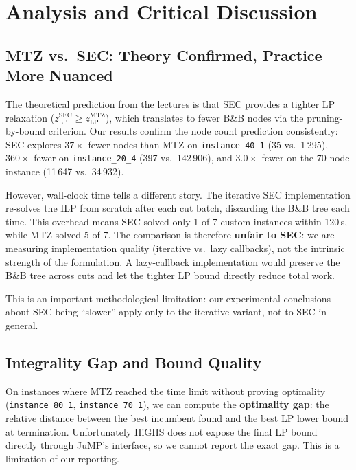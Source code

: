 \documentclass[12pt, a4paper]{article}
\begin{document}
\section{Analysis and Critical Discussion}

\subsection{MTZ vs.\ SEC: Theory Confirmed, Practice More Nuanced}

The theoretical prediction from the lectures is that SEC provides a tighter LP
relaxation ($z_{\mathrm{LP}}^{\mathrm{SEC}} \geq z_{\mathrm{LP}}^{\mathrm{MTZ}}$),
which translates to fewer B\&B nodes via the pruning-by-bound criterion. Our results
confirm the node count prediction consistently: SEC explores $37\times$ fewer nodes
than MTZ on \texttt{instance\_40\_1} (35 vs.\ 1\,295), $360\times$ fewer on
\texttt{instance\_20\_4} (397 vs.\ 142\,906), and $3.0\times$ fewer on the 70-node
instance (11\,647 vs.\ 34\,932).

However, wall-clock time tells a different story. The iterative SEC implementation
re-solves the ILP from scratch after each cut batch, discarding the B\&B tree each
time. This overhead means SEC solved only 1 of 7 custom instances within 120\,s,
while MTZ solved 5 of 7. The comparison is therefore \textbf{unfair to SEC}: we are
measuring implementation quality (iterative vs.\ lazy callbacks), not the intrinsic
strength of the formulation. A lazy-callback implementation would preserve the B\&B
tree across cuts and let the tighter LP bound directly reduce total work.

This is an important methodological limitation: our experimental conclusions about
SEC being ``slower'' apply only to the iterative variant, not to SEC in general.

\subsection{Integrality Gap and Bound Quality}

On instances where MTZ reached the time limit without proving optimality
(\texttt{instance\_80\_1}, \texttt{instance\_70\_1}), we can compute the
\textbf{optimality gap}: the relative distance between the best incumbent found
and the best LP lower bound at termination. Unfortunately HiGHS does not
expose the final LP bound directly through JuMP's interface, so we cannot report
the exact gap. This is a limitation of our reporting.
\end{document}
